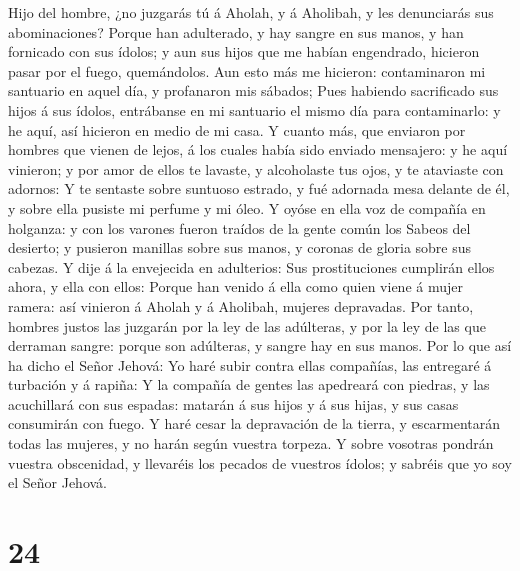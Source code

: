 Hijo del hombre, ¿no juzgarás tú á Aholah, y á Aholibah, y les
denunciarás sus abominaciones?  Porque han adulterado, y
hay sangre en sus manos, y han fornicado con sus ídolos; y aun sus hijos
que me habían engendrado, hicieron pasar por el fuego, quemándolos.
 Aun esto más me hicieron: contaminaron mi santuario en
aquel día, y profanaron mis sábados;  Pues habiendo
sacrificado sus hijos á sus ídolos, entrábanse en mi santuario el mismo
día para contaminarlo: y he aquí, así hicieron en medio de mi casa.
 Y cuanto más, que enviaron por hombres que vienen de
lejos, á los cuales había sido enviado mensajero: y he aquí vinieron; y
por amor de ellos te lavaste, y alcoholaste tus ojos, y te ataviaste con
adornos:  Y te sentaste sobre suntuoso estrado, y fué
adornada mesa delante de él, y sobre ella pusiste mi perfume y mi óleo.
 Y oyóse en ella voz de compañía en holganza: y con los
varones fueron traídos de la gente común los Sabeos del desierto; y
pusieron manillas sobre sus manos, y coronas de gloria sobre sus
cabezas.  Y dije á la envejecida en adulterios: Sus
prostituciones cumplirán ellos ahora, y ella con ellos: 
Porque han venido á ella como quien viene á mujer ramera: así vinieron á
Aholah y á Aholibah, mujeres depravadas.  Por tanto,
hombres justos las juzgarán por la ley de las adúlteras, y por la ley de
las que derraman sangre: porque son adúlteras, y sangre hay en sus
manos.  Por lo que así ha dicho el Señor Jehová: Yo haré
subir contra ellas compañías, las entregaré á turbación y á rapiña:
 Y la compañía de gentes las apedreará con piedras, y las
acuchillará con sus espadas: matarán á sus hijos y á sus hijas, y sus
casas consumirán con fuego.  Y haré cesar la depravación de
la tierra, y escarmentarán todas las mujeres, y no harán según vuestra
torpeza.  Y sobre vosotras pondrán vuestra obscenidad, y
llevaréis los pecados de vuestros ídolos; y sabréis que yo soy el Señor
Jehová.

\hypertarget{section-23}{%
\section{24}\label{section-23}}

